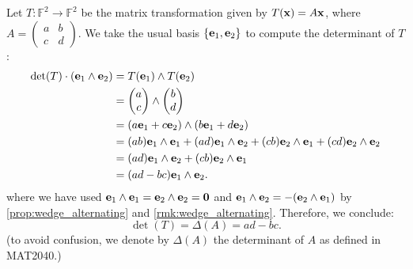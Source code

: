 \begin{example}
Let $T: \mathbb{F}^2 \to \mathbb{F}^2$ be the matrix transformation given by $T({\bf x}) = A{\bf x}$, where $A = \begin{pmatrix}
    a & b \\ c & d
\end{pmatrix}$.
We take the usual basis $\{{\bf e}_1, {\bf e}_2\}$ to compute the determinant of $T$:
\begin{align*}
\det(T) \cdot ({\bf e}_1 \wedge {\bf e}_2)
&= T({\bf e}_1) \wedge T({\bf e}_2) \\
&= \begin{pmatrix} a \\ c \end{pmatrix} \wedge \begin{pmatrix} b \\ d \end{pmatrix} \\
&= (a {\bf e}_1 + c {\bf e}_2) \wedge (b {\bf e}_1 + d {\bf e}_2) \\
&= (a b) {\bf e}_1 \wedge {\bf e}_1 + (a d) {\bf e}_1 \wedge {\bf e}_2 + (c b) {\bf e}_2 \wedge {\bf e}_1 + (c d) {\bf e}_2 \wedge {\bf e}_2 \\
&= (a d) {\bf e}_1 \wedge {\bf e}_2 + (c b) {\bf e}_2 \wedge {\bf e}_1 \\
&= (a d - b c) {\bf e}_1 \wedge {\bf e}_2.
\end{align*}
where we have used ${\bf e}_1 \wedge {\bf e}_1 = {\bf e}_2 \wedge {\bf e}_2 = {\bf 0}$ and ${\bf e}_1 \wedge {\bf e}_2 = -({\bf e}_2 \wedge {\bf e}_1)$ by \autoref{prop:wedge_alternating} and \autoref{rmk:wedge_alternating}. Therefore, we conclude:
\[
\det(T) = \Delta(A) = a d - b c.
\]
(to avoid confusion, we denote by $\Delta(A)$ the determinant of $A$ as defined in MAT2040.)
\end{example}

